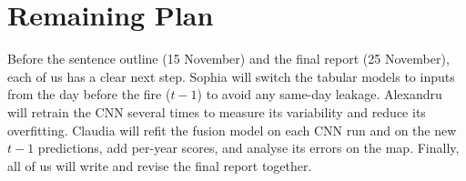 \section{Remaining Plan}
\label{sec:plan}



Before the sentence outline (15 November) and the final report (25 November), each of us has a clear next step. Sophia will switch the tabular models to inputs from the day before the fire ($t-1$) to avoid any same-day leakage. Alexandru will retrain the CNN several times to measure its variability and reduce its overfitting. Claudia will refit the fusion model on each CNN run and on the new $t-1$ predictions, add per-year scores, and analyse its errors on the map. Finally, all of us will write and revise the final report together.